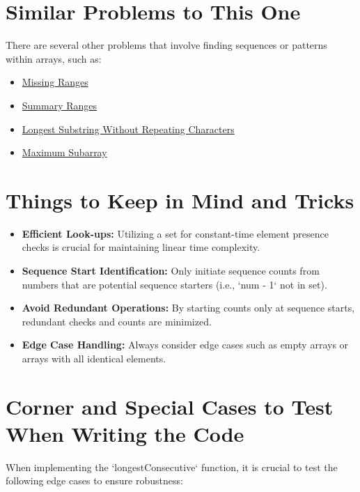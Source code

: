 \section*{Similar Problems to This One}
There are several other problems that involve finding sequences or patterns within arrays, such as:
\begin{itemize}
	\item \hyperref[problem:missing_ranges]{Missing Ranges}
	\item \hyperref[problem:summary_ranges]{Summary Ranges}
	\item \hyperref[problem:longest_substring_without_repeating_characters]{Longest Substring Without Repeating Characters}
	\item \hyperref[problem:maximum_subarray]{Maximum Subarray}
\end{itemize}

\section*{Things to Keep in Mind and Tricks}
\begin{itemize}
	\item \textbf{Efficient Look-ups:} Utilizing a set for constant-time element presence checks is crucial for maintaining linear time complexity.
	
	\item \textbf{Sequence Start Identification:} Only initiate sequence counts from numbers that are potential sequence starters (i.e., `num - 1` not in set).
	
	\item \textbf{Avoid Redundant Operations:} By starting counts only at sequence starts, redundant checks and counts are minimized.
	
	\item \textbf{Edge Case Handling:} Always consider edge cases such as empty arrays or arrays with all identical elements.
\end{itemize}

\section*{Corner and Special Cases to Test When Writing the Code}
When implementing the `longestConsecutive` function, it is crucial to test the following edge cases to ensure robustness:

